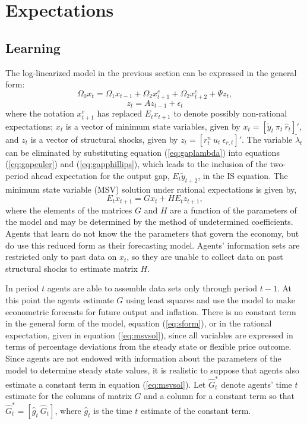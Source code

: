 \documentclass[10pt]{article}
\newcommand{\beq}{\begin{equation}}
\newcommand{\eeq}{\end{equation}}
\newcommand{\h}[1]{\hat{#1}}
\begin{document}
\section{Expectations} \label{s:exp}
\subsection{Learning}
The log-linearized model in the previous section can be expressed in the general form:
\beq \label{eq:sform} \Omega_{0} x_t = \Omega_{1} x_{t-1} + \Omega_{2} x_{t+1}^e + \Omega_{2} x_{t+2}^e + \Psi z_t, \eeq
\beq \label{eq:sformsh} z_t = A z_{t-1} + \epsilon_t \eeq
where the notation $x_{t+1}^e$ has replaced $E_t x_{t+1}$ to denote possibly non-rational expectations; $x_t$ is a vector of minimum state variables, given by  $x_t = [\tilde{y}_t~ \pi_t~ \h{r}_t]'$, and $z_t$ is a vector of structural shocks, given by $z_t = [r_t^n~ u_t~ \epsilon_{r,t}]'$.  The variable $\tilde{\lambda}_t$ can be eliminated by substituting equation (\ref{eq:gaplambda}) into equations (\ref{eq:gapeuler}) and (\ref{eq:gapphillips}), which leads to the inclusion of the two-period ahead expectation for the output gap, $E_t \tilde{y}_{t+2}$, in the IS equation.  The minimum state variable (MSV) solution under rational expectations is given by,
\beq \label{eq:msvsol} E_t x_{t+1} = G x_{t} + H E_t z_{t+1}, \eeq
where the elements of the matrices $G$ and $H$ are a function of the parameters of the model and may be determined by the method of undetermined coefficients.  Agents that learn do not know the the parameters that govern the economy, but do use this reduced form as their forecasting model.  Agents' information sets are restricted only to past data on $x_t$, so they are unable to collect data on past structural shocks to estimate matrix $H$.  

In period $t$ agents are able to assemble data sets only through period $t-1$.  At this point the agents estimate $G$ using least squares and use the model to make econometric forecasts for future output and inflation.  There is no constant term in the general form of the model, equation (\ref{eq:sform}), or in the rational expectation, given in equation (\ref{eq:msvsol}), since all variables are expressed in terms of percentage deviations from the steady state or flexible price outcome.  Since agents are not endowed with information about the parameters of the model to determine steady state values, it is realistic to suppose that agents also estimate a constant term in equation (\ref{eq:msvsol}).  Let $\h{G}_t^*$ denote agents' time $t$ estimate for the columns of matrix $G$ and a column for a constant term so that $\h{G}_t^* = [\h{g}_{t}~ \h{G}_t]$, where $\h{g}_{t}$ is the time $t$ estimate of the constant term. 
\end{document}
